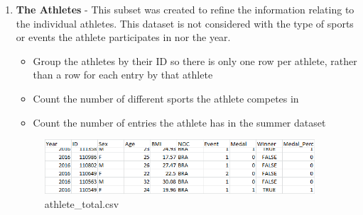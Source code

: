 \documentclass[a4 paper, 12pt]{article}
\begin{document}
        \begin{enumerate} 
            \item \textbf{The Athletes} - This subset was created to refine the information relating to the individual athletes. This dataset is not considered with the type of sports or events the athlete participates in nor the year. 
                \begin{itemize}
                    \item Group the athletes by their ID so there is only one row per athlete, rather than a row for each entry by that athlete
                    \item Count the number of different sports the athlete competes in
                    \item Count the number of entries the athlete has in the summer dataset
                \end{itemize}
                \begin{figure} [H]
                    \centering
                    \includegraphics[width=0.95\textwidth, frame]
                        {./images/data/athlete_total.png}      
                        \caption{athlete\_total.csv} 
                \end{figure}


\end{enumerate}
\end{document}
